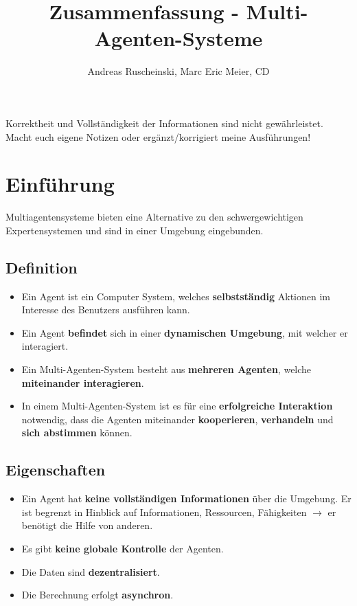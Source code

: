 \documentclass{article} %
\title{Zusammenfassung - Multi-Agenten-Systeme}
\author{
	Andreas Ruscheinski,
	Marc Eric Meier, 
	CD
}
\begin{document}
\maketitle
\begin{framed}Korrektheit und Vollständigkeit der Informationen sind nicht gewährleistet.
Macht euch eigene Notizen oder ergänzt/korrigiert meine Ausführungen!
\end{framed}
\setcounter{tocdepth}{1}
\tableofcontents

\section{Einführung}
	Multiagentensysteme bieten eine Alternative zu den schwergewichtigen Expertensystemen und sind in einer Umgebung eingebunden.
	\subsection{Definition}
	\begin{itemize}
		\item Ein Agent ist ein Computer System, welches \textbf{selbstständig} Aktionen im Interesse des Benutzers ausführen kann.
		\item Ein Agent \textbf{befindet} sich in einer \textbf{dynamischen Umgebung}, mit welcher er interagiert.
		\item Ein Multi-Agenten-System besteht aus \textbf{mehreren Agenten}, welche \textbf{miteinander interagieren}.
		\item In einem Multi-Agenten-System ist es für eine  \textbf{erfolgreiche Interaktion} notwendig, dass die Agenten miteinander \textbf{kooperieren}, \textbf{verhandeln} und \textbf{sich abstimmen} können.
	\end{itemize}
	\subsection{Eigenschaften}
	\begin{itemize}
		\item Ein Agent hat \textbf{keine vollständigen Informationen} über die Umgebung. Er ist begrenzt in Hinblick auf Informationen, Ressourcen, Fähigkeiten $\rightarrow$ er benötigt die Hilfe von anderen.
		\item Es gibt \textbf{keine globale Kontrolle} der Agenten.
		\item Die Daten sind \textbf{dezentralisiert}.
		\item Die Berechnung erfolgt \textbf{asynchron}.
	\end{itemize}
\end{document}
